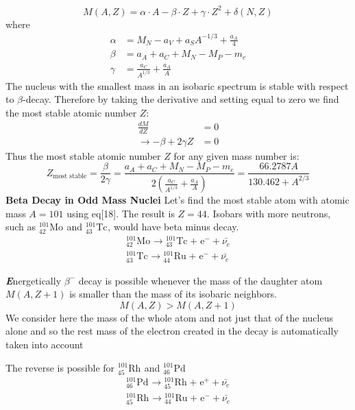 \documentclass[10pt,a4paper]{article}
\newenvironment{callout}
	{\begin{calloutbox}\color{charcoal}\textbf\textit}
	{\end{calloutbox}}
\newcommand{\ch}[5]{{}^{#2}_{#3}\!\text{#1}^{#4}_{#5}}
\begin{document}
\begin{equation}
    M(A,Z) = \alpha\cdot A - \beta\cdot Z + \gamma \cdot Z^2 + \delta(N,Z)
\end{equation}
where
\begin{align*}
    \alpha &= M_N -a_V +a_S A^{-1/3} + \frac{a_A}{4}\\
    \beta  &= a_A + a_C + M_N - M_P- m_e\\
    \gamma &= \frac{a_C}{A^{1/3}} + \frac{a_A}{A} 
\end{align*}
The nucleus with the smallest mass in an isobaric spectrum is stable with respect to $\beta$-decay. Therefore by taking the derivative and setting equal to zero we find the most stable atomic number $Z$:
\begin{align*}
    \frac{dM}{dZ} &= 0 \\
    \rightarrow -\beta + 2\gamma Z &= 0
\end{align*}
Thus the most stable atomic number $Z$ for any given mass number is:
\begin{equation}
    \boxed{
        Z_{\text{most stable}} = \frac{\beta}{2\gamma} = \frac{a_A + a_C + M_N - M_P- m_e}{2\left(\frac{a_C}{A^{1/3}} + \frac{a_A}{A}\right)} = \frac{66.2787 A}{130.462 + A^{2/3} }
    }
\end{equation}
\textbf{Beta Decay in Odd Mass Nuclei}
Let's find the most stable atom with atomic mass $A=101$ using eq[18]. The result is $Z = 44$. Isobars with more neutrons, such as $\ch{Mo}{101}{42}{}{}$ and $\ch{Tc}{101}{43}{}{}$, would have beta minus decay.
\begin{align}
    \ch{Mo}{101}{42}{}{}\rightarrow \ch{Tc}{101}{43}{}{} + \ch{e}{}{}{-}{}+\bar{\nu_e}\\
    \ch{Tc}{101}{43}{}{}\rightarrow \ch{Ru}{101}{44}{}{} + \ch{e}{}{}{-}{} + \bar{\nu_e}
\end{align}

\begin{callout}
    Energetically $\beta^-$ decay is possible whenever the mass of the daughter atom $M(A,Z+1)$ is smaller than the mass of its isobaric neighbors.
    $$
    M(A,Z)> M(A, Z+1)
    $$
    We consider here the mass of the whole atom and not just that of  the nucleus alone and so the rest mass of the electron created in the decay is automatically taken into account
\end{callout}

The reverse is possible for $\ch{Rh}{101}{45}{}{}$ and $\ch{Pd}{101}{46}{}{}$
\begin{align}
    \ch{Pd}{101}{46}{}{}\rightarrow \ch{Rh}{101}{45}{}{} + \ch{e}{}{}{+}{}+\bar{\nu_e}\\
    \ch{Rh}{101}{45}{}{}\rightarrow \ch{Ru}{101}{44}{}{} + \ch{e}{}{}{-}{} + \bar{\nu_e}
\end{align}
\end{document}

